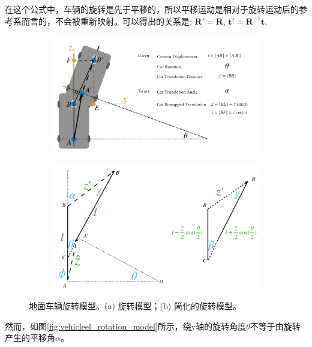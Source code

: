 在这个公式中，车辆的旋转是先于平移的，所以平移运动是相对于旋转运动后的参考系而言的，不会被重新映射。可以得出的关系是:
$\mathbf{R'} = \mathbf{R}$, $\mathbf{t'} = \mathbf{R}^{-1}\mathbf{t}$.
\begin{figure}[ht]
    \centering
    \begin{subfigure}[b]{0.65\textwidth}
        \includegraphics[width=\textwidth]{datavo/vehicle_rotation_1-crop.pdf}
        \caption{}
        \label{fig:vehicel_rotation_model} 
        \vspace{4pt}
    \end{subfigure}
    \begin{subfigure}[b]{0.6\textwidth}
        \includegraphics[width=\textwidth]{datavo/vehicle_rotation_2-crop.pdf}
        \caption{}
        \label{fig:vehicel_rotation_model_s} 
    \end{subfigure}
    \caption{地面车辆旋转模型。(a) 旋转模型；(b) 简化的旋转模型。}
    \label{fig:rotation_model}
\end{figure}
然而，如图\ref{fig:vehicleel_rotation_model}所示，绕y轴的旋转角度$\theta$不等于由旋转产生的平移角$\alpha$。

